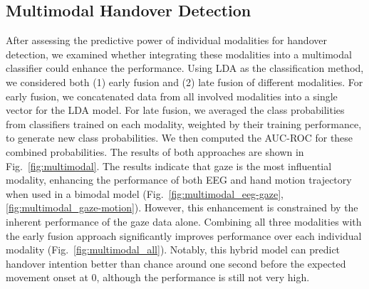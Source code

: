 \subsection*{Multimodal Handover Detection}
\begin{figure*}[t!]
    \centering
    \caption{A comparison between LDA classifiers trained on single modalities versus multiple modalities using early or late fusion. (a) is based on EEG and gaze, (b) is EEG and hand motion, (c) is a gaze and hand motion, and (d) involves all three modalities. Each graph shows the median performance over subjects with the shaded area indicating the interquartile range. Note that a different set of participants is considered in each subplot based on the number of available trials per individual.}
    \label{fig:multimodal}
\end{figure*}

After assessing the predictive power of individual modalities for handover detection, we examined whether integrating these modalities into a multimodal classifier could enhance the performance. Using LDA as the classification method, we considered both (1) early fusion and (2) late fusion of different modalities. For early fusion, we concatenated data from all involved modalities into a single vector for the LDA model. For late fusion, we averaged the class probabilities from classifiers trained on each modality, weighted by their training performance, to generate new class probabilities. We then computed the AUC-ROC for these combined probabilities. The results of both approaches are shown in Fig.~\ref{fig:multimodal}. The results indicate that gaze is the most influential modality, enhancing the performance of both EEG and hand motion trajectory when used in a bimodal model (Fig.~\ref{fig:multimodal_eeg-gaze}, \ref{fig:multimodal_gaze-motion}). However, this enhancement is constrained by the inherent performance of the gaze data alone. Combining all three modalities with the early fusion approach significantly improves performance over each individual modality (Fig.~\ref{fig:multimodal_all}). Notably, this hybrid model can predict handover intention better than chance around one second before the expected movement onset at 0, although the performance is still not very high. 


